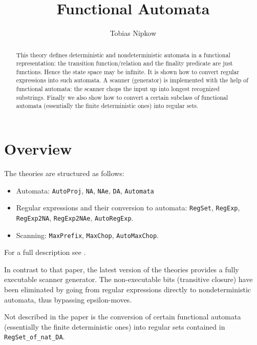 \documentclass[11pt,a4paper]{article}
\begin{document}
\title{Functional Automata}
\author{Tobias Nipkow}
\maketitle

\begin{abstract}
This theory defines deterministic and nondeterministic automata in a
functional representation: the transition function/relation and the finality
predicate are just functions. Hence the state space may be infinite.  It is
shown how to convert regular expressions into such automata. A scanner
(generator) is implemented with the help of functional automata: the scanner
chops the input up into longest recognized substrings. Finally we also show
how to convert a certain subclass of functional automata (essentially the
finite deterministic ones) into regular sets.
\end{abstract}

\section{Overview}

The theories are structured as follows:
\begin{itemize}
\item Automata:
 \texttt{AutoProj}, \texttt{NA}, \texttt{NAe}, \texttt{DA}, \texttt{Automata}
\item Regular expressions and their conversion to automata:
\texttt{RegSet}, \texttt{RegExp}, \texttt{RegExp2NA}, \texttt{RegExp2NAe},
\texttt{AutoRegExp}.
\item Scanning: \texttt{MaxPrefix}, \texttt{MaxChop}, \texttt{AutoMaxChop}.
\end{itemize}
For a full description see \cite{Nipkow-TPHOLs98}.

In contrast to that paper, the latest version of the theories provides a
fully executable scanner generator. The non-executable bits (transitive
closure) have been eliminated by going from regular expressions directly to
nondeterministic automata, thus bypassing epsilon-moves.

Not described in the paper is the conversion of certain functional automata
(essentially the finite deterministic ones) into regular sets contained in
\texttt{RegSet\_of\_nat\_DA}.





\end{document}

